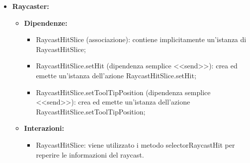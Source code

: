 \begin{itemize}
    \item \textbf{Raycaster:}
    \begin{itemize}
        \item \textbf{Dipendenze:}
        \begin{itemize}
            \item RaycastHitSlice (associazione):  contiene implicitamente un'istanza di RaycastHitSlice;
            \item RaycastHitSlice.setHit (dipendenza semplice <<send>>):  crea ed emette un’istanza dell’azione RaycastHitSlice.setHit;
            \item RaycastHitSlice.setToolTipPosition (dipendenza semplice <<send>>):  crea ed emette un’istanza dell’azione RaycastHitSlice.setToolTipPosition;
        \end{itemize} 
        \item \textbf{Interazioni:}
        \begin{itemize}
            \item RaycastHitSlice: viene utilizzato i metodo selectorRaycastHit per reperire le informazioni del raycast.
        \end{itemize}  
    \end{itemize}
\end{itemize}

